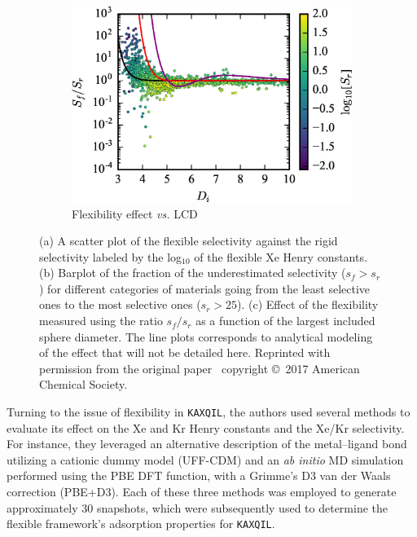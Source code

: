 \documentclass[main]{subfiles}
\begin{document}
\begin{figure}[ht]
\begin{subfigure}[b]{0.32\textwidth}
    \includegraphics[width=\textwidth]{figures/6-perspectives/s_ratio_LCD.jpg}
    \caption{Flexibility effect \emph{vs.} LCD}
  \end{subfigure}
  \caption{ (a) A scatter plot of the flexible selectivity against the rigid selectivity labeled by the log$_10$ of the flexible Xe Henry constants. (b) Barplot of the fraction of the underestimated selectivity ($s_f>s_r$) for different categories of materials going from the least selective ones to the most selective ones ($s_r>25$). (c) Effect of the flexibility measured using the ratio $s_f/s_r$ as a function of the largest included sphere diameter. The line plots corresponds to analytical modeling of the effect that will not be detailed here. Reprinted with permission from the original paper~\cite{Witman_2017} copyright \copyright\ 2017 American Chemical Society. }\label{fgr:flexibility_study}
\end{figure}

Turning to the issue of flexibility in \texttt{KAXQIL}, the authors used several methods to evaluate its effect on the Xe and Kr Henry constants and the Xe/Kr selectivity. For instance, they leveraged an alternative description of the metal--ligand bond utilizing a cationic dummy model (UFF-CDM) and an \emph{ab initio} MD simulation performed using the PBE DFT function,\autocite{Perdew_1996} with a Grimme's D3 van der Waals correction\autocite{Grimme_2010} (PBE+D3). Each of these three methods was employed to generate approximately $30$ snapshots, which were subsequently used to determine the flexible framework's adsorption properties for \texttt{KAXQIL}.
\end{document}

